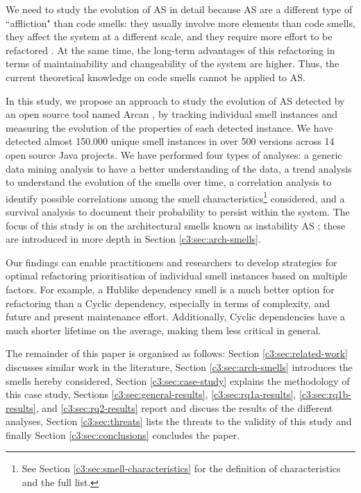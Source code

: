 We need to study the evolution of AS in detail because AS are a different type of ``affliction" than code smells: they usually involve more elements than code smells, they affect the system at a different scale, and they require more effort to be refactored \cite{Lippert2006}. At the same time,  the long-term advantages of this refactoring in terms of maintainability and changeability of the system are higher. Thus, the current theoretical knowledge on code smells cannot be applied to AS.

In this study, we propose an approach to study the evolution of AS detected by an open source tool named Arcan \cite{Arcelli2017}, by tracking individual smell instances and measuring the evolution of the properties of each detected instance. We have detected almost 150.000 unique smell instances in over 500 versions across 14 open source Java projects.
We have performed four types of analyses: a generic data mining analysis to have a better understanding of the data, a trend analysis to understand the evolution of the smells over time, a correlation analysis to identify possible correlations among the smell characteristics\footnote{See Section \ref{c3:sec:smell-characteristics} for the definition of characteristics and the full list.} considered, and a survival analysis to document their probability to persist within the system.
The focus of this study is on the architectural smells known as instability AS \cite{Arcelli2016}; these are introduced in more depth in Section \ref{c3:sec:arch-smells}.

Our findings can enable practitioners and researchers to develop strategies for optimal refactoring prioritisation of individual smell instances based on multiple factors.
For example, a Hublike dependency smell is a much better option for refactoring than a Cyclic dependency, especially in terms of complexity, and future and present maintenance effort.
Additionally, Cyclic dependencies have a much shorter lifetime on the average, making them less critical in general.

The remainder of this paper is organised as follows: Section \ref{c3:sec:related-work} discusses similar work in the literature, Section \ref{c3:sec:arch-smells} introduces the smells hereby considered, Section \ref{c3:sec:case-study} explains the methodology of this case study, Sections \ref{c3:sec:general-results}, \ref{c3:sec:rq1a-results}, \ref{c3:sec:rq1b-results}, and \ref{c3:sec:rq2-results} report and discuss the results of the different analyses, Section \ref{c3:sec:threats} lists the threats to the validity of this study and finally Section \ref{c3:sec:conclusions} concludes the paper.


